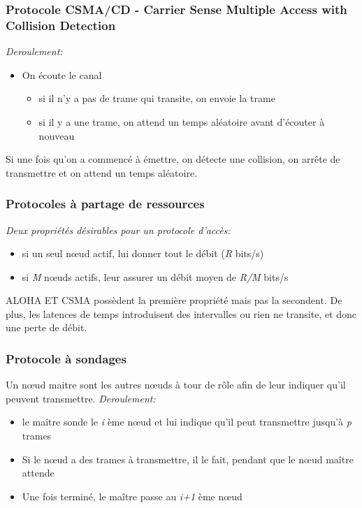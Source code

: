 \documentclass[a4paper, 12pt, french]{article}
\begin{document}
	\subsubsection{Protocole CSMA/CD - Carrier Sense Multiple Access with Collision Detection}

	\emph{Deroulement:}
	\begin{itemize}
		\item On écoute le canal
		\begin{itemize}
			\item si il n'y a pas de trame qui transite, on envoie la trame
			\item si il y a une trame, on attend un temps aléatoire avant d'écouter à nouveau
		\end{itemize}
	\end{itemize}
	Si une fois qu'on a commencé à émettre, on détecte une collision, on arrête de transmettre et on attend un temps aléatoire.

	\subsubsection{Protocoles à partage de ressources}

	\emph{Deux propriétés désirables pour un protocole d'accès:}
	\begin{itemize}
		\item si un seul nœud actif, lui donner tout le débit (\emph{R} bits/s)
		\item si \emph{M} nœuds actifs, leur assurer un débit moyen de \emph{R/M} bits/s
	\end{itemize}

	ALOHA ET CSMA possèdent la première propriété mais pas la secondent. De plus, les latences de temps introduisent des intervalles ou rien ne transite, et donc une perte de débit.

	\subsubsection{Protocole à sondages}

	Un nœud maitre sont les autres nœuds à tour de rôle afin de leur indiquer qu'il peuvent transmettre.
	\emph{Deroulement:}
	\begin{itemize}
		\item le maître sonde le \emph{i} ème nœud et lui indique qu'il peut transmettre jusqu'à \emph{p} trames
		\item Si le nœud a des trames à transmettre, il le fait, pendant que le nœud maître attende
		\item Une fois terminé, le maître passe au \emph{i+1} ème nœud
	\end{itemize}
\end{document}

